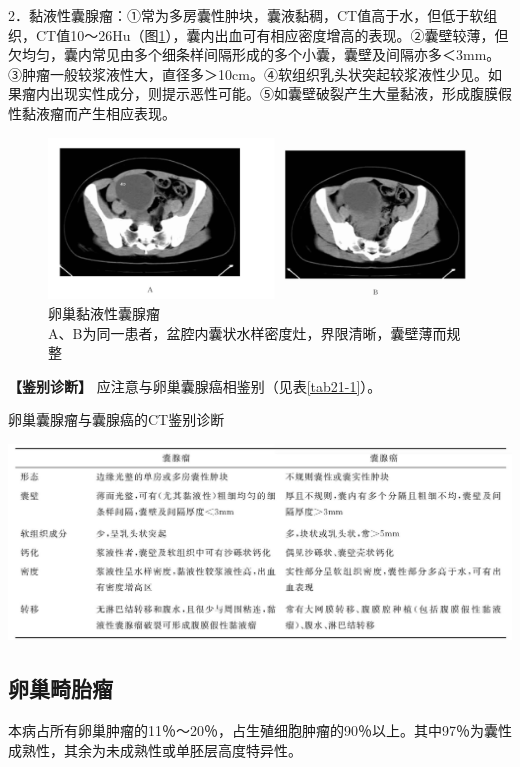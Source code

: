 2．黏液性囊腺瘤：①常为多房囊性肿块，囊液黏稠，CT值高于水，但低于软组织，CT值10～26Hu（图\ref{fig21-12}），囊内出血可有相应密度增高的表现。②囊壁较薄，但欠均匀，囊内常见由多个细条样间隔形成的多个小囊，囊壁及间隔亦多＜3mm。③肿瘤一般较浆液性大，直径多＞10cm。④软组织乳头状突起较浆液性少见。如果瘤内出现实性成分，则提示恶性可能。⑤如囊壁破裂产生大量黏液，形成腹膜假性黏液瘤而产生相应表现。

\begin{figure}[!htbp]
 \centering
 \includegraphics[width=.7\textwidth,height=\textheight,keepaspectratio]{./images/Image00409.jpg}
 \captionsetup{justification=centering}
 \caption{卵巢黏液性囊腺瘤\\{\small A、B为同一患者，盆腔内囊状水样密度灶，界限清晰，囊壁薄而规整}}
 \label{fig21-12}
  \end{figure} 

\textbf{【鉴别诊断】} 应注意与卵巢囊腺癌相鉴别（见表\ref{tab21-1}）。

\begin{table}[htbp]
\centering
\caption{卵巢囊腺瘤与囊腺癌的CT鉴别诊断}
\label{tab21-1}
\includegraphics[width=\textwidth,height=\textheight,keepaspectratio]{./images/Image00410.jpg}
\end{table}

\subsection{卵巢畸胎瘤}

本病占所有卵巢肿瘤的11％～20％，占生殖细胞肿瘤的90％以上。其中97％为囊性成熟性，其余为未成熟性或单胚层高度特异性。


